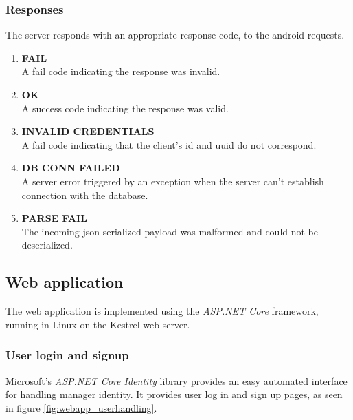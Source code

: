 \subsubsection{Responses}
The server responds with an appropriate response code, to the android requests.
\begin{enumerate}
\item \textbf{FAIL}\\
A fail code indicating the response was invalid.
\item \textbf{OK}\\
A success code indicating the response was valid.
\item \textbf{INVALID CREDENTIALS}\\
A fail code indicating that the client's \ac{id} and \ac{uuid} do not correspond.
\item \textbf{DB CONN FAILED}\\
A server error triggered by an exception when the server can't establish connection with the database.
\item \textbf{PARSE FAIL}\\
The incoming \ac{json} serialized payload was malformed and could not be deserialized.
\end{enumerate}

\subsection{Web application}
The web application is implemented using the \textit{ASP.NET Core} framework, running in Linux on the Kestrel web server.

\subsubsection{User login and signup}
Microsoft's \textit {ASP.NET Core Identity} library provides an easy automated interface for handling manager identity.
It provides user log in and sign up pages, as seen in figure \ref{fig:webapp_userhandling}.

